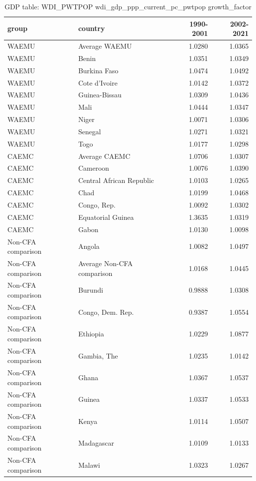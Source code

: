 \begin{table}

\caption{GDP table: WDI_PWTPOP wdi_gdp_ppp_current_pc_pwtpop growth_factor}
\centering
\begin{tabular}[t]{llrr}
\toprule
group & country & 1990-2001 & 2002-2021\\
\midrule
WAEMU & Average WAEMU & 1.0280 & 1.0365\\
WAEMU & Benin & 1.0351 & 1.0349\\
WAEMU & Burkina Faso & 1.0474 & 1.0492\\
WAEMU & Cote d'Ivoire & 1.0142 & 1.0372\\
WAEMU & Guinea-Bissau & 1.0309 & 1.0436\\
\addlinespace
WAEMU & Mali & 1.0444 & 1.0347\\
WAEMU & Niger & 1.0071 & 1.0306\\
WAEMU & Senegal & 1.0271 & 1.0321\\
WAEMU & Togo & 1.0177 & 1.0298\\
CAEMC & Average CAEMC & 1.0706 & 1.0307\\
\addlinespace
CAEMC & Cameroon & 1.0076 & 1.0390\\
CAEMC & Central African Republic & 1.0103 & 1.0265\\
CAEMC & Chad & 1.0199 & 1.0468\\
CAEMC & Congo, Rep. & 1.0092 & 1.0302\\
CAEMC & Equatorial Guinea & 1.3635 & 1.0319\\
\addlinespace
CAEMC & Gabon & 1.0130 & 1.0098\\
Non-CFA comparison & Angola & 1.0082 & 1.0497\\
Non-CFA comparison & Average Non-CFA comparison & 1.0168 & 1.0445\\
Non-CFA comparison & Burundi & 0.9888 & 1.0308\\
Non-CFA comparison & Congo, Dem. Rep. & 0.9387 & 1.0554\\
\addlinespace
Non-CFA comparison & Ethiopia & 1.0229 & 1.0877\\
Non-CFA comparison & Gambia, The & 1.0235 & 1.0142\\
Non-CFA comparison & Ghana & 1.0367 & 1.0537\\
Non-CFA comparison & Guinea & 1.0337 & 1.0533\\
Non-CFA comparison & Kenya & 1.0114 & 1.0507\\
\addlinespace
Non-CFA comparison & Madagascar & 1.0109 & 1.0133\\
Non-CFA comparison & Malawi & 1.0323 & 1.0267\\

\end{tabular}
\end{table}

